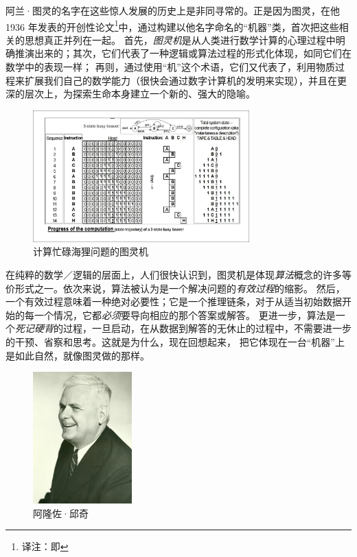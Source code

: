 \documentclass[a4paper,12pt]{article}
\begin{document}
阿兰·图灵的名字在这些惊人发展的历史上是非同寻常的。正是因为图灵，在他 1936 年发表的开创性论文\footnote[3]{译注：即\cite{TuringA1937}}中，通过构建以他名字命名的“机器”类，首次把这些相关的思想真正并列在一起。
首先，\emph{\gls{图灵机}}是从人类进行数学计算的心理过程中明确推演出来的；其次，它们代表了一种逻辑或算法过程的形式化体现，如同它们在数学中的表现一样；
再则，通过使用“机”这个术语，它们又代表了，利用物质过程来扩展我们自己的数学能力（很快会通过数字计算机的发明来实现），并且在更深的层次上，为探索生命本身建立一个新的、强大的隐喻。

\begin{figure}[ht]
\centering
\includegraphics[height=2.0in]{images/turing_machine.jpg}
\caption{计算忙碌海狸问题的图灵机}
\end{figure}

在纯粹的数学／逻辑的层面上，人们很快认识到，图灵机是体现\emph{\gls{算法}}概念的许多等价形式之一。依次来说，算法被认为是一个解决问题的\emph{\gls{有效过程}}的缩影。
然后，一个有效过程意味着一种绝对必要性；它是一个推理链条，对于从适当初始数据开始的每一个情况，它都\emph{必须}要导向相应的那个答案或解答。
更进一步，算法是一个\emph{死记硬背}的过程，一旦启动，在从数据到解答的无休止的过程中，不需要进一步的干预、省察和思考。这就是为什么，现在回想起来，
把它体现在一台“机器”上是如此自然，就像图灵做的那样。

\begin{figure}
  \begin{center}
    \includegraphics[height=2.0in]{images/alonzo_church.jpg}
  \end{center}
  \caption{阿隆佐·邱奇}
\end{figure}
\end{document}
